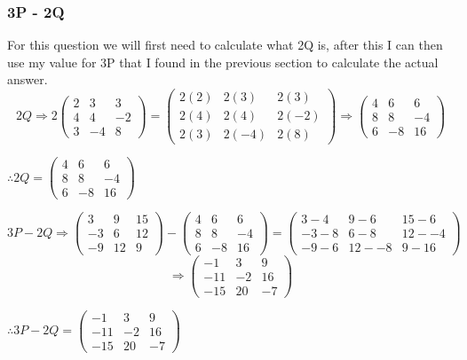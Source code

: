 \documentclass{article}
\begin{document}
\subsubsection{3P - 2Q}

For this question we will first need to calculate what 2Q is, after this I can then use my value for 3P that I found in the previous section to calculate the actual answer.
\[
	2Q \Rightarrow 2
	\begin{pmatrix}
		2 & 3 & 3\\
		4 & 4 & -2\\
		3 & -4 & 8
	\end{pmatrix}
	=
	\begin{pmatrix}
		2(2) & 2(3) & 2(3)\\
		2(4) & 2(4) & 2(-2)\\
		2(3) & 2(-4) & 2(8)
	\end{pmatrix}
	\Rightarrow
	\begin{pmatrix}
		4 & 6 & 6\\
		8 & 8 & -4\\
		6 & -8 & 16
	\end{pmatrix}
\]
\begin{center}\vspace{0.5cm}$\therefore 2Q=\begin{pmatrix} 4 & 6 & 6\\ 8 & 8 & -4\\ 6 & -8 & 16\end{pmatrix}$\end{center}
\[
	3P-2Q
	\Rightarrow
	\begin{pmatrix}
		3 & 9 & 15\\
		-3 & 6 & 12\\
		-9 & 12 & 9
	\end{pmatrix}
	-
	\begin{pmatrix}
		4 & 6 & 6\\
		8 & 8 & -4\\
		6 & -8 & 16
	\end{pmatrix}
	=
	\begin{pmatrix}
		3-4 & 9-6 & 15-6\\
		-3-8 & 6-8 & 12--4\\
		-9-6 & 12--8 & 9-16
	\end{pmatrix}
\]
\[
	\Rightarrow
	\begin{pmatrix}
		-1 & 3 & 9\\
		-11 & -2 & 16\\
		-15 & 20 & -7
	\end{pmatrix}
\]
\begin{center}\vspace{0.5cm}$\therefore 3P-2Q=\begin{pmatrix} -1 & 3 & 9\\ -11 & -2 & 16\\ -15 & 20 & -7\end{pmatrix}$\end{center}
\end{document}
